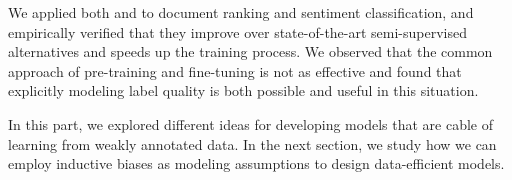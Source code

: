 We applied both \cws and \fwl to document ranking and sentiment classification, and empirically verified that they improve over state-of-the-art semi-supervised alternatives and speeds up the training process. We observed that the common approach of pre-training and fine-tuning is not as effective and found that explicitly modeling label quality is both possible and useful in this situation. 

In this part, we explored different ideas for developing models that are cable of learning from weakly annotated data. In the next section, we study how we can employ inductive biases as modeling assumptions to design data-efficient models.